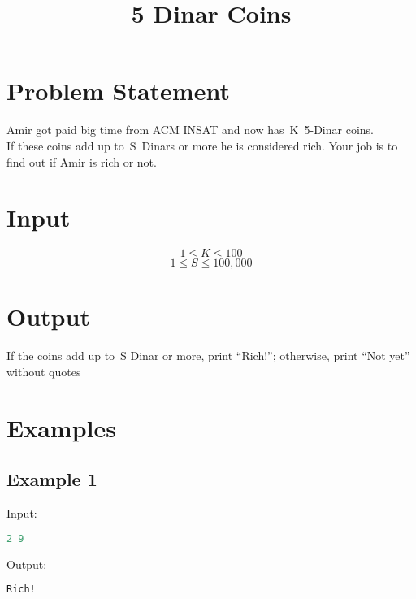 \documentclass[10pt]{article}
\begin{document}
\title{5 Dinar Coins}
 \date{}
\maketitle
\section{Problem Statement}
Amir got paid big time from ACM INSAT and now has K 5-Dinar coins.\\
If these coins add up to S Dinars or more he is considered rich. Your job is to find out if Amir is rich or not.
\paragraph{}
\section{Input}
$$ 1\le K \le 100 $$
$$ 1\le S \le 100,000 $$
\section{Output}

If the coins add up to S Dinar or more, print “Rich!”; otherwise, print “Not yet” without quotes

\section{Examples}
\subsection{Example 1}
Input:
\begin{lstlisting}[language=Python]
2 9
\end{lstlisting}
Output:
\begin{lstlisting}[language=Python]
Rich!
\end{lstlisting}
\end{document}
